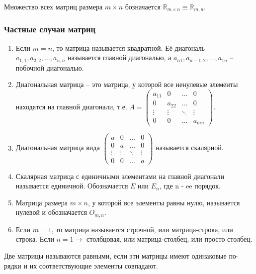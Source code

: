 Множество всех матриц размера $m \times n$ бозначается $\mathds{R}_{m \times n} \equiv \mathds{R}_{m,n}$.

\subsubsection{Частные случаи матриц}
\begin{enumerate}
  \item Если $m = n$, то матрица называется квадратной.
    Её диагональ $a_{1,1}, a_{2,2}, \dots, a_{n,n}$ называется главной диагональю, а $a_{n1}, a_{n-1,2}, \dots, a_{1n}$ – побочной диагональю.

  \item Диагональная матрица – это матрица, у которой все ненулевые элементы находятся на главной диагонали, т.е.
    $A = \left( \begin{array}{cccc}
      a_{11}& 0 &\ldots & 0\\
      0& a_{22} &\ldots & 0\\
      \vdots& \vdots &\ddots & \vdots\\
      0& 0 &\ldots & a_{mn}
    \end{array} \right)$.

  \item Диагональная матрица вида
    $\left( \begin{array}{cccc}
      a& 0 &\ldots & 0\\
      0& a &\ldots & 0\\
      \vdots& \vdots &\ddots & \vdots\\
      0& 0 &\ldots & a
    \end{array} \right)$ называется скалярной.

  \item Скалярная матрица с единичными элементами на главной диагонали называется единичной.
    Обозначается $E$ или $E_{n}$, где n - ee порядок.

  \item Матрица размера $m \times n$, у которой все элементы равны нулю, называется нулевой и обозначается $O_{m,n}$.

  \item Если $m = 1$, то матрица называется строчной, или матрица-строка, или строка.
    Если $n = 1 \rightarrow$ столбцовая, или матрица-столбец, или просто столбец.
\end{enumerate}

\begin{definition}
  Две матрицы называются равными, если эти матрицы имеют одинаковые по-рядки и их соответствующие элементы совпадают.
\end{definition}

